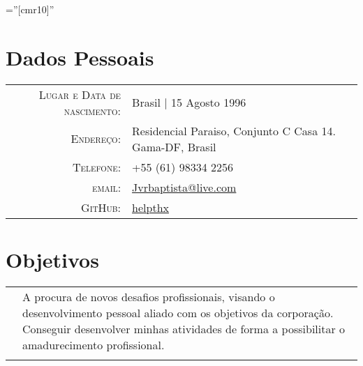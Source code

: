 \documentclass[a4paper,10pt]{article} %
\begin{document}
\pagestyle{empty} %

\font\fb=''[cmr10]'' %


\par{\bigskip\par} %

\section{Dados Pessoais}

\begin{tabular}{rl}
\textsc{Lugar e Data de nascimento:} & Brasil  | 15 Agosto 1996 \\
\textsc{Endereço:} & Residencial Paraiso, Conjunto C Casa 14. Gama-DF, Brasil \\
\textsc{Telefone:} & +55 (61) 98334 2256\\
\textsc{email:} & \href{mailto:Jvrbaptista@live.com}{Jvrbaptista@live.com} \\
\textsc{GitHub:} & \href{https://github.com/helpthx}{helpthx}
\end{tabular}


\section{Objetivos}
\begin{tabular}{r|p{11cm}}
& \footnotesize{A procura de novos desafios profissionais, visando o desenvolvimento pessoal
aliado com os objetivos da corporação. Conseguir desenvolver minhas atividades de
forma a possibilitar o amadurecimento profissional. }\\
\multicolumn{2}{c}{} \\
\end{tabular}

\end{document}
